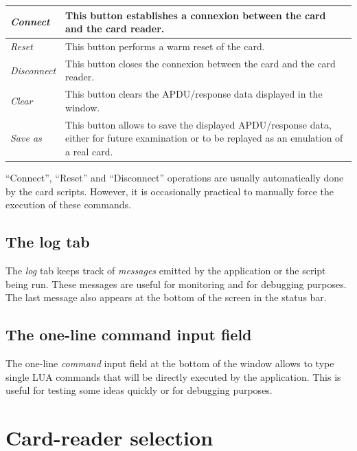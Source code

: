 \documentclass[11pt]{report}
\begin{document}
\vspace{1em}\noindent
\begin{tabular}{l|p{12cm}}
\hline
\emph{Connect}    & This button establishes a connexion between the card and the card reader. \\  
\hline
\emph{Reset}      & This button performs a warm reset of the card.\\
\hline
\emph{Disconnect} & This button closes the connexion between the card and the card reader.\\
\hline
\emph{Clear}      & This button clears the APDU/response data displayed in the window. \\
\hline
\emph{Save as}     & This button allows to save the displayed APDU/response data, either for future examination or
		     to be replayed as an emulation of a real card. \\
\hline
\end{tabular}
\vspace{2em}

``Connect'', ``Reset'' and ``Disconnect'' operations are usually automatically done by the card scripts.
However, it is occasionally practical to manually force the execution of these commands.

\subsection{The log tab}

The \emph{log} tab keeps track of \emph{messages} emitted by the application or the script being run.
These messages are useful for monitoring and for debugging purposes. 
The last message also appears at the bottom of the screen in the status bar.

\subsection{The one-line command input field}

The one-line \emph{command} input field at the bottom of the window allows to type single LUA commands that will be 
directly executed by the application.
This is useful for testing some ideas quickly or for debugging purposes.

\section{Card-reader selection}
\end{document}
